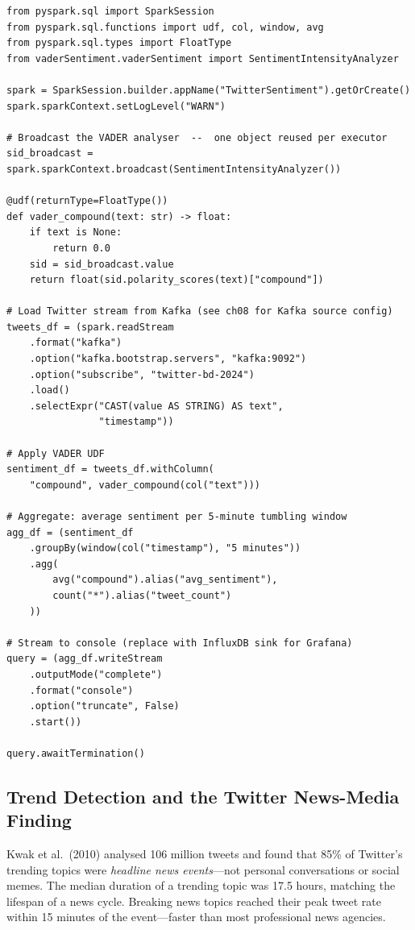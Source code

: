 \begin{lstlisting}[style=pyspark, caption={VADER sentiment in a PySpark
  pipeline (UDF on tweet DataFrame)}]
from pyspark.sql import SparkSession
from pyspark.sql.functions import udf, col, window, avg
from pyspark.sql.types import FloatType
from vaderSentiment.vaderSentiment import SentimentIntensityAnalyzer

spark = SparkSession.builder.appName("TwitterSentiment").getOrCreate()
spark.sparkContext.setLogLevel("WARN")

# Broadcast the VADER analyser  --  one object reused per executor
sid_broadcast = spark.sparkContext.broadcast(SentimentIntensityAnalyzer())

@udf(returnType=FloatType())
def vader_compound(text: str) -> float:
    if text is None:
        return 0.0
    sid = sid_broadcast.value
    return float(sid.polarity_scores(text)["compound"])

# Load Twitter stream from Kafka (see ch08 for Kafka source config)
tweets_df = (spark.readStream
    .format("kafka")
    .option("kafka.bootstrap.servers", "kafka:9092")
    .option("subscribe", "twitter-bd-2024")
    .load()
    .selectExpr("CAST(value AS STRING) AS text",
                "timestamp"))

# Apply VADER UDF
sentiment_df = tweets_df.withColumn(
    "compound", vader_compound(col("text")))

# Aggregate: average sentiment per 5-minute tumbling window
agg_df = (sentiment_df
    .groupBy(window(col("timestamp"), "5 minutes"))
    .agg(
        avg("compound").alias("avg_sentiment"),
        count("*").alias("tweet_count")
    ))

# Stream to console (replace with InfluxDB sink for Grafana)
query = (agg_df.writeStream
    .outputMode("complete")
    .format("console")
    .option("truncate", False)
    .start())

query.awaitTermination()
\end{lstlisting}

\subsection{Trend Detection and the Twitter News-Media Finding}
\label{subsec:trends}

Kwak et al.\ (2010) analysed 106 million tweets and found that 85\%
of Twitter's trending topics were \emph{headline news events}---not
personal conversations or social memes. The median duration of a
trending topic was 17.5 hours, matching the lifespan of a news cycle.
Breaking news topics reached their peak tweet rate within 15 minutes
of the event---faster than most professional news agencies.

